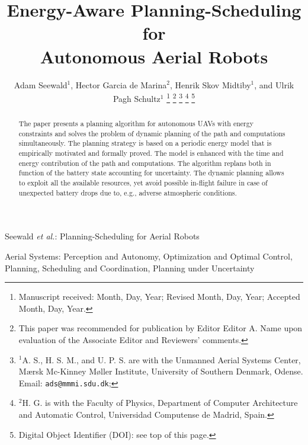 \documentclass[letterpaper,10pt,journal,twoside]{IEEEtran}
\theoremstyle{definition}
\begin{document}
\title{Energy-Aware Planning-Scheduling for\\Autonomous Aerial Robots}

\author{
  Adam Seewald$^{\text{1}}$, Hector Garcia de Marina$^{\text{2}}$, Henrik Skov Midtiby$^{\text{1}}$, and Ulrik Pagh Schultz$^{\text{1}}$
  \thanks{Manuscript received: Month, Day, Year; Revised Month, Day, Year; Accepted Month, Day, Year.}%
  \thanks{This paper was recommended for publication by Editor Editor A. Name upon evaluation of the Associate Editor and Reviewers' comments.} %
  \thanks{$^{\text{1}}$A. S., H. S. M., and U. P. S. are with the Unmanned Aerial Systems Center, M{\ae}rsk Mc-Kinney M{\o}ller Institute, University of Southern Denmark, Odense. Email: {\tt\footnotesize ads@mmmi.sdu.dk};} 
  \thanks{$^{\text{2}}$H. G. is with the Faculty of Physics, Department of Computer Architecture and Automatic Control, Universidad Computense de Madrid, Spain.}
  \thanks{Digital Object Identifier (DOI): see top of this page.}
}

{Seewald \MakeLowercase{\textit{et al.}}: Planning-Scheduling for Aerial Robots} 

\maketitle

\begin{abstract}
  The paper presents a planning algorithm for autonomous UAVs with energy constraints and solves the problem of dynamic planning of the path and computations simultaneously. The planning strategy is based on a periodic energy model that is empirically motivated and formally proved. The model is enhanced with the time and energy contribution of the path and computations. The algorithm replans both in function of the battery state accounting for uncertainty. The dynamic planning allows to exploit all the available resources, yet avoid possible in-flight failure in case of unexpected battery drops due to, e.g., adverse atmospheric conditions.
\end{abstract}

\begin{IEEEkeywords}
  Aerial Systems: Perception and Autonomy, Optimization and Optimal Control, Planning, Scheduling and Coordination, Planning under Uncertainty
\end{IEEEkeywords}
\end{document}
